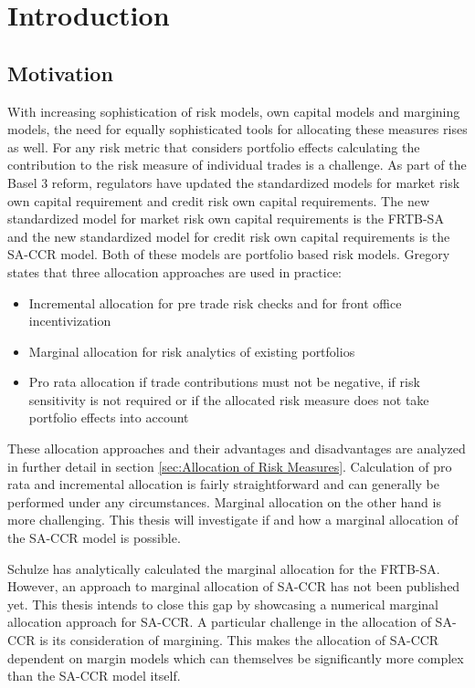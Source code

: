 \documentclass[../Thesis_AHoecherl.tex]{subfiles}
\begin{document}
    \chapter{Introduction}
    \section{Motivation}
    With increasing sophistication of risk models, own capital models and margining models, the need for equally sophisticated tools for allocating these measures rises as well. For any risk metric that considers portfolio effects calculating the contribution to the risk measure of individual trades is a challenge. As part of the Basel 3 reform, regulators have updated the standardized models for market risk own capital requirement and credit risk own capital requirements. The new standardized model for market risk own capital requirements is the \gls{FRTB-SA} and the new standardized model for credit risk own capital requirements is the \gls{SA-CCR} model. Both of these models are portfolio based risk models. Gregory \cite[Chapter~10.7]{gregory2015xva} states that three allocation approaches are used in practice:

    \begin{itemize}
        \item Incremental allocation for pre trade risk checks and for front office incentivization  
        \item Marginal allocation for risk analytics of existing portfolios 
        \item Pro rata allocation if trade contributions must not be negative, if risk sensitivity is not required or if the allocated risk measure does not take portfolio effects into account
    \end{itemize}

    These allocation approaches and their advantages and disadvantages are analyzed in further detail in section \ref{sec:Allocation of Risk Measures}. Calculation of pro rata and incremental allocation is fairly straightforward and can generally be performed under any circumstances. Marginal allocation on the other hand is more challenging. This thesis will investigate if and how a marginal allocation of the SA-CCR model is possible.

    Schulze \cite{schulze2018capital} has analytically calculated the marginal allocation for the FRTB-SA. However, an approach to marginal allocation of SA-CCR has not been published yet. This thesis intends to close this gap by showcasing a numerical marginal allocation approach for SA-CCR. A particular challenge in the allocation of SA-CCR is its consideration of margining. This makes the allocation of SA-CCR dependent on margin models which can themselves be significantly more complex than the SA-CCR model itself.
\end{document}
